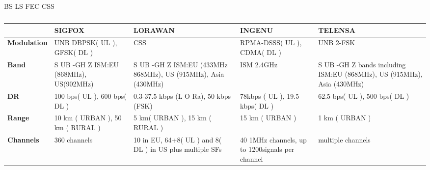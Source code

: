 \ac{BS}
\ac{LS}
\ac{FEC} 
\ac{CSS}

\begin{table}[h!]
\scriptsize
	\begin{tabulary}{\columnwidth}{L|L|L|L|L}
	\                                            & \textbf{SIGFOX}                               & \textbf{LORAWAN}                                              & \textbf{INGENU}                                 & \textbf{TELENSA} \\\hline                                                              
	\textbf{Modulation}                          & UNB DBPSK( UL ), GFSK( DL )                   & CSS                                                           & RPMA-DSSS( UL ), CDMA( DL )                     & UNB 2-FSK \\\hline                                                             
	\textbf{Band}                                & S UB -GH Z ISM:EU (868MHz), US(902MHz)        & S UB -GH Z ISM:EU (433MHz 868MHz), US (915MHz), Asia (430MHz) & ISM 2.4GHz                                      & S UB -GH Z bands including ISM:EU (868MHz), US (915MHz), Asia (430MHz) \\\hline
	\textbf{\ac{DR}}                             & 100 bps( UL ), 600 bps( DL )                  & 0.3-37.5 kbps (L O Ra), 50 kbps (FSK)                         & 78kbps ( UL ), 19.5 kbps( DL )                  & 62.5 bps( UL ), 500 bps( DL ) \\\hline                                         
	\textbf{Range}                               & 10 km ( URBAN ), 50 km ( RURAL )              & 5 km( URBAN ), 15 km ( RURAL )                                & 15 km ( URBAN )                                 & 1 km ( URBAN ) \\\hline                                                        
	\textbf{Channels}                            & 360 channels                                  & 10 in EU, 64+8( UL ) and 8( DL ) in US plus multiple SFs      & 40 1MHz channels, up to 1200signals per channel & multiple channels \\\hline                                                     
	\end{tabulary}
\caption{\label{tab:edesf} \cite{raza_low_22}}
\end{table}


